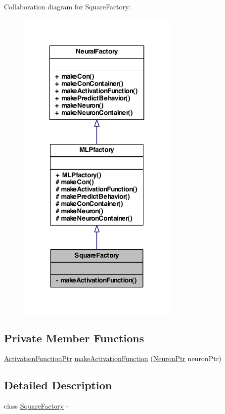 Collaboration diagram for SquareFactory:
\nopagebreak
\begin{figure}[H]
\begin{center}
\leavevmode
\includegraphics[width=222pt]{class_square_factory__coll__graph}
\end{center}
\end{figure}
\subsection*{Private Member Functions}
\begin{DoxyCompactItemize}
\item 
\hyperlink{_a_m_o_r_e_8h_a77602a0277a02e5769c3df0adc669b17}{ActivationFunctionPtr} \hyperlink{class_square_factory_a1fe378c014b3713865f88c49e96ba938}{makeActivationFunction} (\hyperlink{_a_m_o_r_e_8h_ac1ea936c2c7728eb382278131652fef4}{NeuronPtr} neuronPtr)
\end{DoxyCompactItemize}


\subsection{Detailed Description}
class \hyperlink{class_square_factory}{SquareFactory} -\/ 

